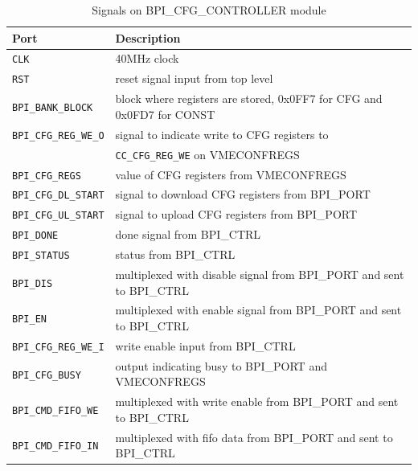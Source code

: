 \documentclass[10pt,a4paper]{article}
\begin{document}
%
\begin{table}[H]
\centering
\begin{tabular}{|l|l|} \hline
Port& Description\\ \hline
\texttt{CLK}& 40MHz clock\\ \hline
\texttt{RST}& reset signal input from top level\\ \hline
\texttt{BPI\_BANK\_BLOCK}& block where registers are stored, 0x0FF7 for CFG and 0x0FD7 for CONST\\ \hline
\texttt{BPI\_CFG\_REG\_WE\_O}& signal to indicate write to CFG registers to\\
                             & \texttt{CC\_CFG\_REG\_WE} on VMECONFREGS\\ \hline
\texttt{BPI\_CFG\_REGS}& value of CFG registers from VMECONFREGS\\ \hline
\texttt{BPI\_CFG\_DL\_START}& signal to download CFG registers from BPI\_PORT\\ \hline
\texttt{BPI\_CFG\_UL\_START}& signal to upload CFG registers from BPI\_PORT\\ \hline
\texttt{BPI\_DONE}& done signal from BPI\_CTRL\\ \hline
\texttt{BPI\_STATUS}& status from BPI\_CTRL\\ \hline
\texttt{BPI\_DIS}& multiplexed with disable signal from BPI\_PORT and sent to BPI\_CTRL\\ \hline
\texttt{BPI\_EN}& multiplexed with enable signal from BPI\_PORT and sent to BPI\_CTRL\\ \hline
\texttt{BPI\_CFG\_REG\_WE\_I}& write enable input from BPI\_CTRL\\ \hline
\texttt{BPI\_CFG\_BUSY}& output indicating busy to BPI\_PORT and VMECONFREGS\\ \hline
\texttt{BPI\_CMD\_FIFO\_WE}& multiplexed with write enable from BPI\_PORT and sent to BPI\_CTRL\\ \hline
\texttt{BPI\_CMD\_FIFO\_IN}& multiplexed with fifo data from BPI\_PORT and sent to BPI\_CTRL\\ \hline
\end{tabular}
\caption{Signals on BPI\_CFG\_CONTROLLER module}
\label{tab:cfgcontrollerinterface}
\end{table}
\end{document}
